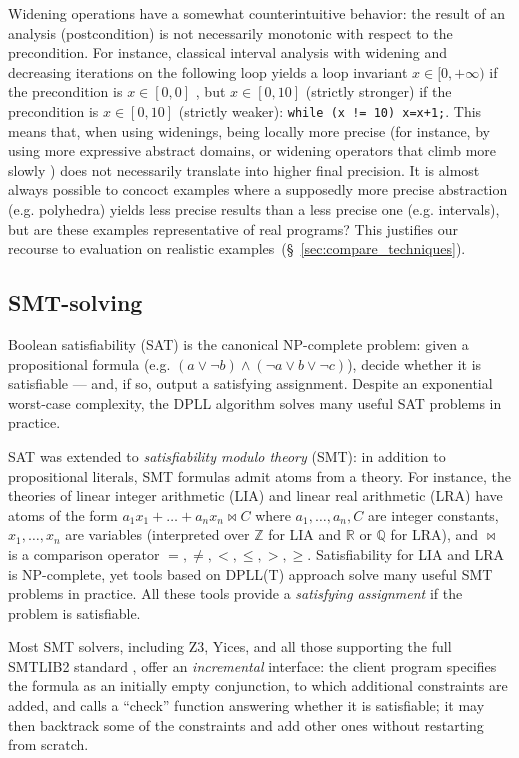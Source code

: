 \documentclass[preprint]{sigplanconf}
\newcommand{\ZZ}{\mathbb{Z}}
\newcommand{\QQ}{\mathbb{Q}}
\newcommand{\RR}{\mathbb{R}}
\begin{document}
Widening operations have a somewhat counterintuitive behavior: the result of an analysis (postcondition) is not necessarily monotonic with respect to the precondition. For instance, classical interval analysis with widening and decreasing iterations on the following loop yields a loop invariant $x \in [0,+\infty)$ if the precondition is $x \in [0,0]$ , but $x \in [0,10]$ (strictly stronger) if the precondition is $x \in [0,10]$ (strictly weaker):
\lstinline|while (x != 10) x=x+1;|.
This means that, when using widenings, being locally more precise (for instance, by using more expressive abstract domains, or widening operators that climb more slowly \cite{BagnaraHRZ05SCP}) does not necessarily translate into higher final precision.
It is almost always possible to concoct examples where a supposedly more precise abstraction (e.g. polyhedra) yields less precise results than a less precise one (e.g. intervals), but are these examples representative of real programs?
This justifies our recourse to evaluation on realistic examples~(\S~\ref{sec:compare_techniques}).

\subsection{SMT-solving}
Boolean satisfiability (SAT) is the canonical NP-complete problem: given a propositional formula (e.g. $(a \lor \neg b) \land (\neg a \lor b \lor \neg c)$), decide whether it is satisfiable --- and, if so, output a satisfying assignment.
Despite an exponential worst-case complexity, the DPLL algorithm \cite{Kroening_Strichman_08,Handbook_SAT} solves many useful SAT problems in practice.

SAT was extended to \emph{satisfiability modulo theory} (SMT): in addition to propositional literals, SMT formulas admit atoms from a theory.
For instance, the theories of linear integer arithmetic (LIA) and linear real arithmetic (LRA) have atoms of the form $a_1 x_1 + \dots + a_n x_n \bowtie C$ where $a_1,\dots,a_n,C$ are integer constants, $x_1,\dots,x_n$ are variables (interpreted over $\ZZ$ for LIA and $\RR$ or $\QQ$ for LRA), and $\bowtie$ is a comparison operator $=,\neq,<,\leq,>,\geq$.
Satisfiability for LIA and LRA is NP-complete, yet tools based on DPLL(T) approach \cite{Kroening_Strichman_08,Handbook_SAT} solve many useful SMT problems in practice. All these tools provide a \emph{satisfying assignment} if the problem is satisfiable.

Most SMT solvers, including Z3,
Yices,%
and all those supporting the full SMTLIB2 standard \cite{BarST-SMTLIB},
offer an \emph{incremental} interface: the client program specifies the formula as an initially empty conjunction, to which additional constraints are added, and calls a ``check'' function answering whether it is satisfiable; 
it may then backtrack some of the constraints and add other ones without restarting from scratch.
\end{document}
